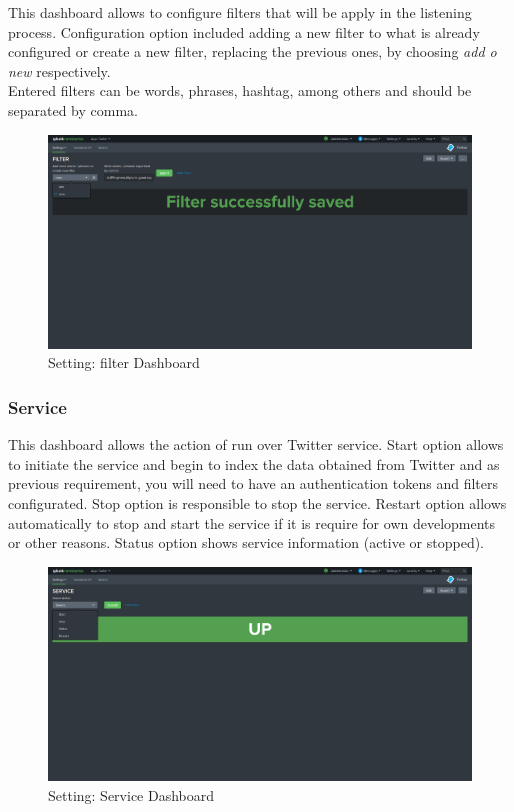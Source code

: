 \documentclass[report]{article}
\begin{document}
This dashboard allows to configure filters that will be apply in the listening process. Configuration option included adding a new filter to what is already configured or create a new filter, replacing the previous ones, by choosing \textit{add o new} respectively.\\
Entered filters can be words, phrases, hashtag, among others and should be separated by comma. 
\newline
\begin{figure}[h!]
	\centering
	\includegraphics[scale=0.2]{img/filter.png}
	\caption{\color{text}Setting: filter Dashboard}
\end{figure}

\subsubsection{Service}
This dashboard allows  the action of run over Twitter service. Start option allows to initiate the service and begin to index the data obtained from Twitter and as previous requirement, you will need to have an authentication tokens and filters configurated. Stop option is responsible to stop the service. Restart option allows automatically to stop and start the service if it is require for own developments or other reasons. Status option shows service information (active or stopped).
\newline
\begin{figure}[h!]
	\centering
	\includegraphics[scale=0.2]{img/service.png}
	\caption{\color{text}Setting: Service Dashboard}
\end{figure}
\end{document}

